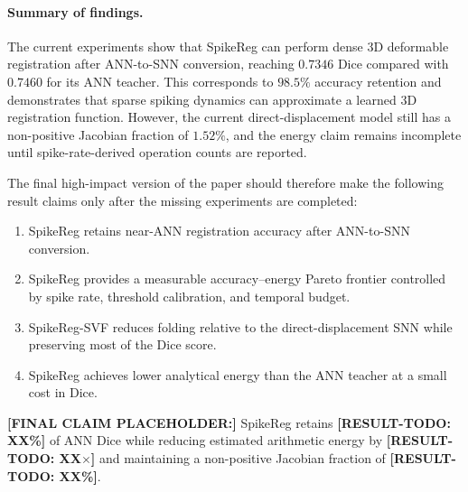 \paragraph{Summary of findings.}
The current experiments show that SpikeReg can perform dense 3D deformable registration after ANN-to-SNN conversion, reaching $0.7346$ Dice compared with $0.7460$ for its ANN teacher. This corresponds to $98.5\%$ accuracy retention and demonstrates that sparse spiking dynamics can approximate a learned 3D registration function. However, the current direct-displacement model still has a non-positive Jacobian fraction of $1.52\%$, and the energy claim remains incomplete until spike-rate-derived operation counts are reported.

The final high-impact version of the paper should therefore make the following result claims only after the missing experiments are completed:

\begin{enumerate}
    \item SpikeReg retains near-ANN registration accuracy after ANN-to-SNN conversion.
    \item SpikeReg provides a measurable accuracy--energy Pareto frontier controlled by spike rate, threshold calibration, and temporal budget.
    \item SpikeReg-SVF reduces folding relative to the direct-displacement SNN while preserving most of the Dice score.
    \item SpikeReg achieves lower analytical energy than the ANN teacher at a small cost in Dice.
\end{enumerate}

\textbf{[FINAL CLAIM PLACEHOLDER:]} SpikeReg retains \textbf{[RESULT-TODO: XX\%]} of ANN Dice while reducing estimated arithmetic energy by \textbf{[RESULT-TODO: XX$\times$]} and maintaining a non-positive Jacobian fraction of \textbf{[RESULT-TODO: XX\%]}.